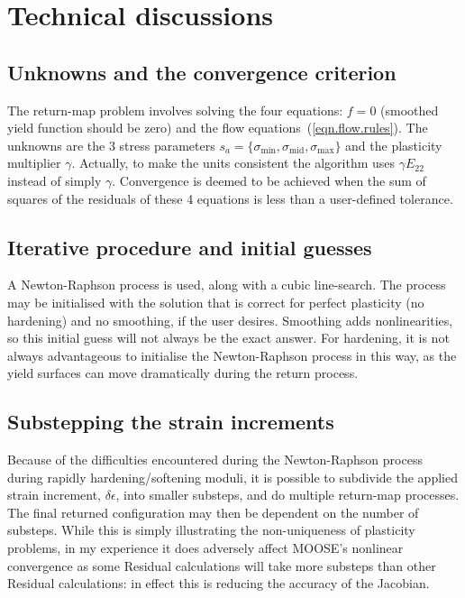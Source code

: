 \documentclass[]{scrreprt}
\newcommand{\ga}{\gamma}
\newcommand{\smax}{\sigma_{\mathrm{max}}}
\newcommand{\smid}{\sigma_{\mathrm{mid}}}
\newcommand{\smin}{\sigma_{\mathrm{min}}}
\begin{document}
\chapter{Technical discussions}

\section{Unknowns and the convergence criterion}
The return-map problem involves solving the four equations: $f=0$ (smoothed yield function
should be zero) and the flow equations~(\ref{eqn.flow.rules}).  The
unknowns are the 3 stress parameters $s_{a}=\{\smin, \smid,
\smax\}$ and the plasticity multiplier $\ga$.  Actually, to
make the units consistent the algorithm uses $\ga E_{22}$ instead of
simply $\ga$.  Convergence
is deemed to be achieved when the sum of squares of the residuals of
these 4 equations is less than a user-defined tolerance.

\section{Iterative procedure and initial guesses}
A Newton-Raphson process is used, along with a cubic line-search.  The
process may be initialised with the solution that is correct for
perfect plasticity (no hardening) and no smoothing, if the user
desires.  Smoothing adds nonlinearities, so this initial guess will
not always be the exact answer. For hardening, it is not
always advantageous to initialise the Newton-Raphson process in this
way, as the yield surfaces can move dramatically during the return
process.

\section{Substepping the strain increments}
Because of the difficulties encountered during the Newton-Raphson
process during rapidly hardening/softening moduli, it is possible to
subdivide the applied strain increment, $\delta\epsilon$, into smaller
substeps, and do multiple return-map processes.  The final returned configuration may then
be dependent on the number of substeps.  While this is simply
illustrating the non-uniqueness of plasticity problems, in my
experience it does adversely affect MOOSE's nonlinear convergence as
some Residual calculations will take more substeps than other Residual
calculations: in effect this is reducing the accuracy of the Jacobian.
\end{document}
